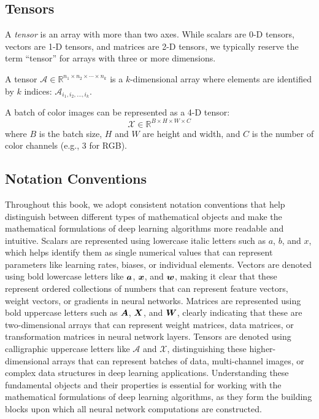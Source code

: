 \subsection{Tensors}

A \emph{tensor} is an array with more than two axes. While scalars are 0-D tensors, vectors are 1-D tensors, and matrices are 2-D tensors, we typically reserve the term ``tensor'' for arrays with three or more dimensions.

\begin{definition}[Tensor]
A tensor $\mathcal{A} \in \mathbb{R}^{n_1 \times n_2 \times \cdots \times n_k}$ is a $k$-dimensional array where elements are identified by $k$ indices: $\mathcal{A}_{i_1, i_2, \ldots, i_k}$.
\end{definition}

\begin{example}
A batch of color images can be represented as a 4-D tensor:
\begin{equation}
    \mathcal{X} \in \mathbb{R}^{B \times H \times W \times C}
\end{equation}
where $B$ is the batch size, $H$ and $W$ are height and width, and $C$ is the number of color channels (e.g., 3 for RGB).
\end{example}

\subsection{Notation Conventions}

Throughout this book, we adopt consistent notation conventions that help distinguish between different types of mathematical objects and make the mathematical formulations of deep learning algorithms more readable and intuitive. Scalars are represented using lowercase italic letters such as $a$, $b$, and $x$, which helps identify them as single numerical values that can represent parameters like learning rates, biases, or individual elements. Vectors are denoted using bold lowercase letters like $\boldsymbol{a}$, $\boldsymbol{x}$, and $\boldsymbol{w}$, making it clear that these represent ordered collections of numbers that can represent feature vectors, weight vectors, or gradients in neural networks. Matrices are represented using bold uppercase letters such as $\boldsymbol{A}$, $\boldsymbol{X}$, and $\boldsymbol{W}$, clearly indicating that these are two-dimensional arrays that can represent weight matrices, data matrices, or transformation matrices in neural network layers. Tensors are denoted using calligraphic uppercase letters like $\mathcal{A}$ and $\mathcal{X}$, distinguishing these higher-dimensional arrays that can represent batches of data, multi-channel images, or complex data structures in deep learning applications. Understanding these fundamental objects and their properties is essential for working with the mathematical formulations of deep learning algorithms, as they form the building blocks upon which all neural network computations are constructed.
